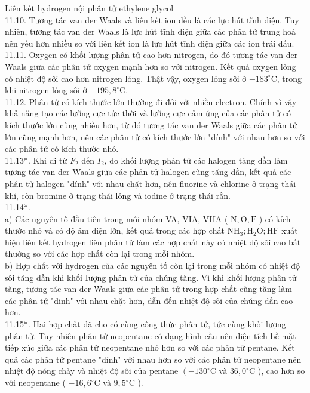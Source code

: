 \documentclass[10pt]{article}
\begin{document}
Liên kết hydrogen nội phân tử ethylene glycol\\
11.10. Tương tác van der Waals và liên kết ion đều là các lực hút tĩnh điện. Tuy nhiên, tương tác van der Waals là lực hút tĩnh điện giữa các phân tử trung hoà nên yếu hơn nhiều so với liên kết ion là lực hút tĩnh điện giữa các ion trái dấu.\\
11.11. Oxygen có khối lượng phân tử cao hơn nitrogen, do đó tương tác van der Waals giữa các phân tử oxygen mạnh hơn so với nitrogen. Kết quả oxygen lỏng có nhiệt độ sôi cao hơn nitrogen lỏng. Thật vậy, oxygen lỏng sôi ở $-183^{\circ} \mathrm{C}$, trong khi nitrogen lỏng sôi ở $-195,8^{\circ} \mathrm{C}$.\\
11.12. Phân tử có kích thước lớn thường đi đôi với nhiều electron. Chính vì vậy khả năng tạo các lưỡng cực tức thời và lưỡng cực cảm ứng của các phân tử có kích thước lớn cũng nhiều hơn, từ đó tương tác van der Waals giữa các phân tử lớn cũng mạnh hơn, nên các phân tử có kích thước lớn "dính" với nhau hơn so với các phân tử có kích thước nhỏ.\\
11.13*. Khi đi từ $F_{2}$ đến $I_{2}$, do khối lượng phân tử các halogen tăng dần làm tương tác van der Waals giữa các phân tử halogen cũng tăng dần, kết quả các phân tử halogen "dính" với nhau chặt hơn, nên fluorine và chlorine ở trạng thái khí, còn bromine ở trạng thái lỏng và iodine ở trạng thái rắn.\\
11.14*.\\
a) Các nguyên tố đầu tiên trong mỗi nhóm VA, VIA, VIIA ( $\mathrm{N}, \mathrm{O}, \mathrm{F}$ ) có kích thước nhỏ và có độ âm điện lớn, kết quả trong các hợp chất $\mathrm{NH}_{3} ; \mathrm{H}_{2} \mathrm{O} ; \mathrm{HF}$ xuất hiện liên kết hydrogen liên phân tử làm các hợp chất này có nhiệt độ sôi cao bất thường so với các hợp chất còn lại trong mỗi nhóm.\\
b) Hợp chất với hydrogen của các nguyên tố còn lại trong mỗi nhóm có nhiệt độ sôi tăng dần khi khối Iượng phân tử của chúng tăng. Vì khi khối lượng phân tử tăng, tương tác van der Waals giữa các phân tử trong hợp chất cũng tăng làm các phân tử "dinh" với nhau chặt hơn, dẫn đến nhiệt độ sôi của chúng dần cao hơn.\\
11.15*. Hai hợp chất đã cho có cùng công thức phân tử, tức cùng khối lượng phân tử. Tuy nhiên phân tử neopentane có dạng hình cầu nên diện tích bề mặt tiếp xúc giữa các phân tử neopentane nhỏ hơn so với các phân tử pentane. Kết quả các phân tử pentane "dính" với nhau hơn so với các phân tử neopentane nên nhiệt độ nóng chảy và nhiệt độ sôi của pentane $\left(-130^{\circ} \mathrm{C}\right.$ và $36,0^{\circ} \mathrm{C}$ ), cao hơn so với neopentane ( $-16,6^{\circ} \mathrm{C}$ và $9,5^{\circ} \mathrm{C}$ ).\\
\end{document}
